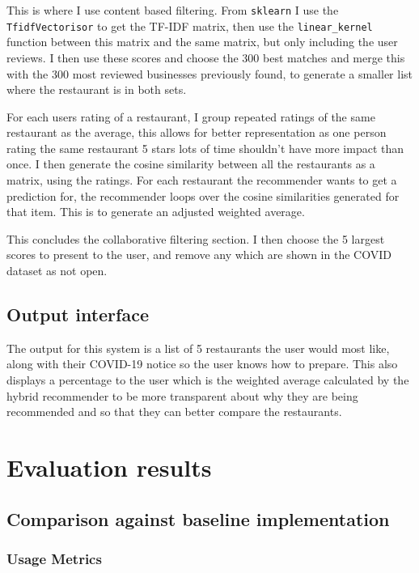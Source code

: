 \documentclass[conference]{IEEEtran}
\begin{document}
This is where I use content based filtering. From \texttt{sklearn} I use the \texttt{TfidfVectorisor} to get the TF-IDF matrix, then use the \texttt{linear\_kernel} function between this matrix and the same matrix, but only including the user reviews. I then use these scores and choose the 300 best matches and merge this with the 300 most reviewed businesses previously found, to generate a smaller list where the restaurant is in both sets.

For each users rating of a restaurant, I group repeated ratings of the same restaurant as the average, this allows for better representation as one person rating the same restaurant 5 stars lots of time shouldn't have more impact than once. I then generate the cosine similarity between all the restaurants as a matrix, using the ratings. For each restaurant the recommender wants to get a prediction for, the recommender loops over the cosine similarities generated for that item. This is to generate an adjusted weighted average.

This concludes the collaborative filtering section. I then choose the 5 largest scores to present to the user, and remove any which are shown in the COVID dataset as not open.

\subsection{Output interface}

The output for this system is a list of 5 restaurants the user would most like, along with their COVID-19 notice so the user knows how to prepare. This also displays a percentage to the user which is the weighted average calculated by the hybrid recommender to be more transparent about why they are being recommended and so that they can better compare the restaurants.

\section{Evaluation results}

\subsection{Comparison against baseline implementation}

\subsubsection{Usage Metrics}
\end{document}
